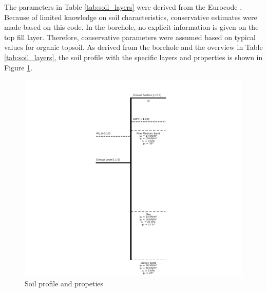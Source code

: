 


The parameters in Table \ref{tab:soil_layers} were derived from the Eurocode \autocite{stichtingkoninklijknederlandsnormalisatieinstituutNederlandseNormNEN2025}. Because of limited knowledge on soil characteristics, conservative estimates were made based on this code. In the borehole, no explicit information is given on the top fill layer. Therefore, conservative parameters were assumed based on typical values for organic topsoil. As derived from the borehole and the overview in Table \ref{tab:soil_layers}, the soil profile with the specific layers and properties is shown in Figure \ref{fig:soil_profile_cross_section}. 

\begin{figure}[H]
    \centering
    \includegraphics[width=0.55\linewidth]{figures/ch8/soil_profile.png}
    \caption{Soil profile and propeties}
    \label{fig:soil_profile_cross_section}
\end{figure}

